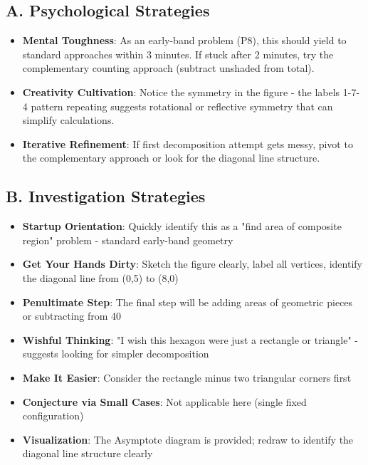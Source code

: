 \documentclass[11pt]{article}
\begin{document}
\begin{strategicbox}
\subsection*{A. Psychological Strategies}
\begin{itemize}[leftmargin=*]
    \item \textbf{Mental Toughness}: As an early-band problem (P8), this should yield to standard approaches within 3 minutes. If stuck after 2 minutes, try the complementary counting approach (subtract unshaded from total).
    \item \textbf{Creativity Cultivation}: Notice the symmetry in the figure - the labels 1-7-4 pattern repeating suggests rotational or reflective symmetry that can simplify calculations.
    \item \textbf{Iterative Refinement}: If first decomposition attempt gets messy, pivot to the complementary approach or look for the diagonal line structure.
\end{itemize}

\subsection*{B. Investigation Strategies}
\begin{itemize}[leftmargin=*]
    \item \textbf{Startup Orientation}: Quickly identify this as a "find area of composite region" problem - standard early-band geometry
    \item \textbf{Get Your Hands Dirty}: Sketch the figure clearly, label all vertices, identify the diagonal line from (0,5) to (8,0)
    \item \textbf{Penultimate Step}: The final step will be adding areas of geometric pieces or subtracting from 40
    \item \textbf{Wishful Thinking}: "I wish this hexagon were just a rectangle or triangle" - suggests looking for simpler decomposition
    \item \textbf{Make It Easier}: Consider the rectangle minus two triangular corners first
    \item \textbf{Conjecture via Small Cases}: Not applicable here (single fixed configuration)
    \item \textbf{Visualization}: The Asymptote diagram is provided; redraw to identify the diagonal line structure clearly
\end{itemize}


\end{strategicbox}
\end{document}
